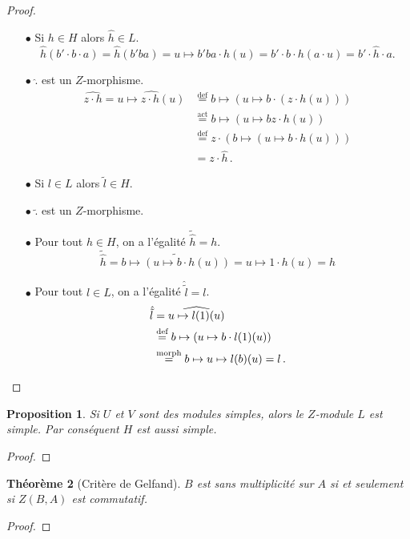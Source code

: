 \documentclass[francais,a4paper,11pt,reqno]{amsart}
\theoremstyle{plain}
\newtheorem{THEO}{\bf Théorème}[section]
\newtheorem{PROP}[THEO]{\bf Proposition}
\theoremstyle{definition}
\theoremstyle{remark}
\newcommand{\act}{\cdot}
\newcommand\eqcom[1]{\mathrel{\overset{\text{#1}}{=}}}
\begin{document}
\begin{proof}
  \begin{itemize}
  \item[$\bullet$] Si $h\in H$ alors $\hat{h}\in L$.
    \begin{equation}
      \hat h(b'\act b\act a) = \hat h(b'ba) = u\mapsto b'ba \act h(u)
      = b'\act b\act h(a\act u) = b' \act \hat{h} \act a.
    \end{equation}
  \item[$\bullet$] $\hat{.}$ est un $Z$-morphisme.
    \begin{align}
      \widehat{z\act h} = \widehat{u\mapsto z\act h(u)}
      &\eqcom{def}b\mapsto(u\mapsto b\act(z\act h(u)))\\
      &\eqcom{act}b\mapsto(u\mapsto bz\act h(u))\\
      &\eqcom{def}z\act(b\mapsto(u\mapsto b\act h(u)))\\
      &=z\act\hat{h}\,.
    \end{align}
  \item[$\bullet$] Si $l\in L$ alors $\tilde{l}\in H$.
    \TODO{}
  \item[$\bullet$] $\tilde{.}$ est un $Z$-morphisme.
    \TODO{}
  \item[$\bullet$] Pour tout $h\in H$, on a l'égalité $\tilde{\hat{h}} = h$.
    \begin{equation}
      \tilde{\hat{h}} = \widetilde{b \mapsto (u \mapsto b\act h(u))}
      = u \mapsto 1\act h(u) = h
    \end{equation}
  \item[$\bullet$] Pour tout $l\in L$, on a l'égalité $\hat{\tilde{l}} = l$.
    \begin{align}
      \hat{\tilde{l}} &= \widehat{u \mapsto l(1)(u)}\\
      &\eqcom{def}b \mapsto (u \mapsto b\act l(1)(u)) \\
      &\eqcom{morph}b \mapsto u \mapsto l(b)(u) = l\,.\qedhere
    \end{align}
  \end{itemize}
\end{proof}

\begin{PROP}
  Si $U$ et $V$ sont des modules simples, alors le $Z$-module $L$ est
  simple. Par conséquent $H$ est aussi simple.
\end{PROP}
\begin{proof}
  \TODO{}
\end{proof}
\begin{THEO}[Critère de Gelfand]
  $B$ est sans multiplicité sur $A$ si et seulement si $Z(B, A)$ est
  commutatif.
\end{THEO}
\begin{proof}
  \TODO{}
\end{proof}
\end{document}
